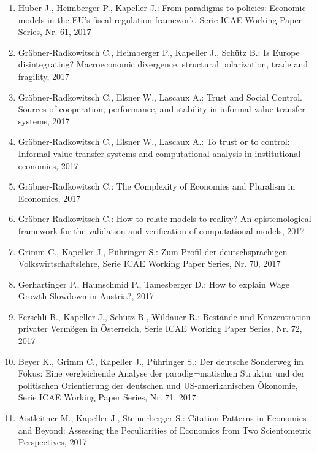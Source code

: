 \begin{enumerate}
	 \item Huber J., Heimberger P., Kapeller J.: From paradigms to policies: Economic models in the EU’s fiscal regulation framework, Serie ICAE Working Paper Series, Nr. 61, 2017
	 \item Gräbner-Radkowitsch C., Heimberger P., Kapeller J., Schütz B.: Is Europe disintegrating? Macroeconomic divergence, structural polarization, trade and fragility, 2017
	 \item Gräbner-Radkowitsch C., Elsner W., Lascaux A.: Trust and Social Control. Sources of cooperation, performance, and stability in informal value transfer systems, 2017
	 \item Gräbner-Radkowitsch C., Elsner W., Lascaux A.: To trust or to control: Informal value transfer systems and computational analysis in institutional economics, 2017
	 \item Gräbner-Radkowitsch C.: The Complexity of Economies and Pluralism in Economics, 2017
	 \item Gräbner-Radkowitsch C.: How to relate models to reality? An epistemological framework for the validation and verification of computational models, 2017
	 \item Grimm C., Kapeller J., Pühringer S.: Zum Profil der deutschsprachigen Volkswirtschaftslehre, Serie ICAE Working Paper Series, Nr. 70, 2017
	 \item Gerhartinger P., Haunschmid P., Tamesberger D.: How to explain Wage Growth Slowdown in Austria?, 2017
	 \item Ferschli B., Kapeller J., Schütz B., Wildauer R.: Bestände und Konzentration privater Vermögen in Österreich, Serie ICAE Working Paper Series, Nr. 72, 2017
	 \item Beyer K., Grimm C., Kapeller J., Pühringer S.: Der deutsche Sonderweg im Fokus: Eine vergleichende Analyse der paradig¬matischen Struktur und der politischen Orientierung der deutschen und US-amerikanischen Ökonomie, Serie ICAE Working Paper Series, Nr. 71, 2017
	 \item Aistleitner M., Kapeller J., Steinerberger S.: Citation Patterns in Economics and Beyond: Assessing the Peculiarities of Economics from Two Scientometric Perspectives, 2017
\end{enumerate}
